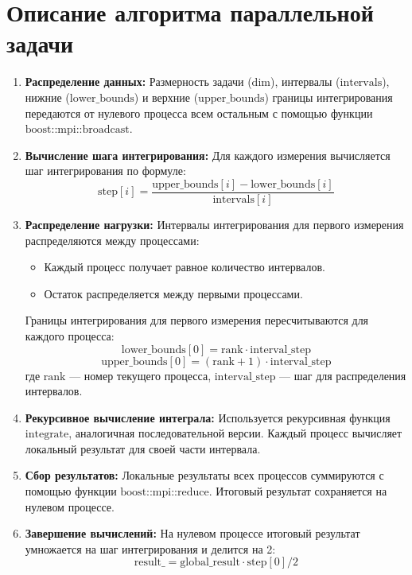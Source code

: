 \documentclass{article}
\begin{document}
\section{Описание алгоритма параллельной задачи}
\begin{enumerate}
    \item \textbf{Распределение данных:} 
    Размерность задачи (\(\text{dim}\)), интервалы (\(\text{intervals}\)), нижние (\(\text{lower\_bounds}\)) и верхние (\(\text{upper\_bounds}\)) границы интегрирования передаются от нулевого процесса всем остальным с помощью функции \(\text{boost::mpi::broadcast}\).

    \item \textbf{Вычисление шага интегрирования:} 
    Для каждого измерения вычисляется шаг интегрирования по формуле:
    \[
    \text{step}[i] = \frac{\text{upper\_bounds}[i] - \text{lower\_bounds}[i]}{\text{intervals}[i]}
    \]

    \item \textbf{Распределение нагрузки:} 
    Интервалы интегрирования для первого измерения распределяются между процессами:
    \begin{itemize}
        \item Каждый процесс получает равное количество интервалов.
        \item Остаток распределяется между первыми процессами.
    \end{itemize}
    Границы интегрирования для первого измерения пересчитываются для каждого процесса:
    \[
    \text{lower\_bounds}[0] = \text{rank} \cdot \text{interval\_step}
    \]
    \[
    \text{upper\_bounds}[0] = (\text{rank} + 1) \cdot \text{interval\_step}
    \]
    где \(\text{rank}\) — номер текущего процесса, \(\text{interval\_step}\) — шаг для распределения интервалов.

    \item \textbf{Рекурсивное вычисление интеграла:} 
    Используется рекурсивная функция \(\text{integrate}\), аналогичная последовательной версии. Каждый процесс вычисляет локальный результат для своей части интервала.

    \item \textbf{Сбор результатов:} 
    Локальные результаты всех процессов суммируются с помощью функции \(\text{boost::mpi::reduce}\). Итоговый результат сохраняется на нулевом процессе.

    \item \textbf{Завершение вычислений:} 
    На нулевом процессе итоговый результат умножается на шаг интегрирования и делится на 2:
    \[
    \text{result\_} = \text{global\_result} \cdot \text{step}[0] / 2
    \]
\end{enumerate}
\vspace{1.0cm}
\end{document}
